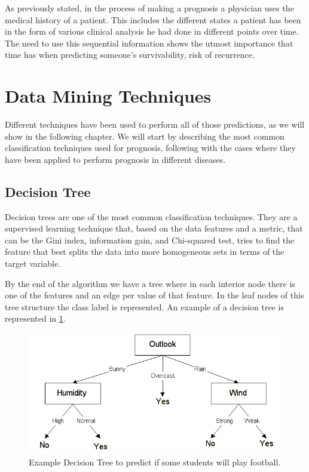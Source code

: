 As previously stated, in the process of making a prognosis a physician uses the medical history of a patient. This includes the different states 
a patient has been in the form of various clinical analysis he had done in different points over time. The need to use this sequential information 
shows the utmost importance that time has when predicting someone’s survivability, risk of recurrence.

\section{Data Mining Techniques}
\label{section:dataminingtech}

Different techniques have been used to perform all of those predictions, as we will show in the following chapter.
 We will start by describing the most common classification techniques used for prognosis, following with the cases 
 where they have been applied to perform prognosis in different diseases.

\subsection{Decision Tree}
\label{subsection:dt}

Decision trees are one of the most common classification techniques. They are a supervised learning technique that, based on the data
 features and a metric, that can be the Gini index, information gain, and Chi-squared test, tries to find the feature that best splits 
 the data into more homogeneous sets in terms of the target variable. 

By the end of the algorithm we have a tree where in each interior node there is one of the features and an edge per value of that 
feature. In the leaf nodes of this tree structure the class label is represented. An example of a decision tree is represented in \ref{fig:dt}.

\begin{figure}[!htb]
  \centering
  \includegraphics[width=1\textwidth]{Figures/dt.png}
  \caption{Example Decision Tree to predict if some students will play football.}
  \label{fig:dt}
\end{figure}

